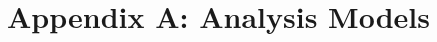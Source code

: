 \documentclass{scrreprt}
\begin{document}
\chapter{Appendix A: Analysis Models}



    
\clearpage
\end{document}
